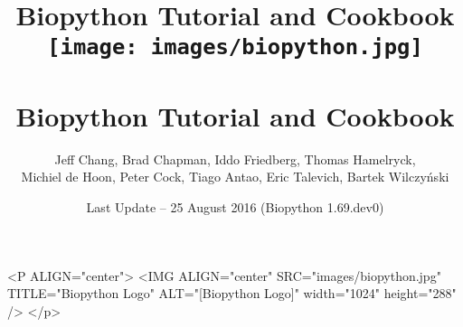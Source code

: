 \documentclass{report}
\begin{document}
\begin{htmlonly}
\title{Biopython Tutorial and Cookbook}
\end{htmlonly}
\begin{latexonly}
\title{
\texttt{[image: images/biopython.jpg]}\\
~\\
Biopython Tutorial and Cookbook}
\end{latexonly}

\author{Jeff Chang, Brad Chapman, Iddo Friedberg, Thomas Hamelryck, \\
Michiel de Hoon, Peter Cock, Tiago Antao, Eric Talevich, Bartek Wilczy\'{n}ski}
\date{Last Update -- 25 August 2016 (Biopython 1.69.dev0)}

\begin{rawhtml}
<P ALIGN="center">
<IMG ALIGN="center" SRC="images/biopython.jpg" TITLE="Biopython Logo" ALT="[Biopython Logo]" width="1024" height="288" />
</p>
\end{rawhtml}

\maketitle
\tableofcontents








\end{document}
